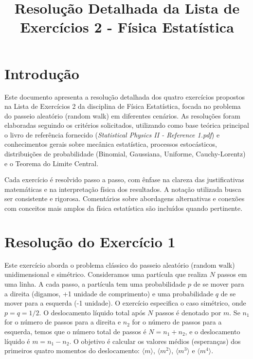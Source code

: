 \documentclass[12pt]{article}
\title{Resolução Detalhada da Lista de Exercícios 2 - Física Estatística}
\author{}
\date{}
\begin{document}
\maketitle

\section*{Introdução}

Este documento apresenta a resolução detalhada dos quatro exercícios propostos na Lista de Exercícios 2 da disciplina de Física Estatística, focada no problema do passeio aleatório (random walk) em diferentes cenários. As resoluções foram elaboradas seguindo os critérios solicitados, utilizando como base teórica principal o livro de referência fornecido (\textit{Statistical Physics II - Reference 1.pdf}) e conhecimentos gerais sobre mecânica estatística, processos estocásticos, distribuições de probabilidade (Binomial, Gaussiana, Uniforme, Cauchy-Lorentz) e o Teorema do Limite Central.

Cada exercício é resolvido passo a passo, com ênfase na clareza das justificativas matemáticas e na interpretação física dos resultados. A notação utilizada busca ser consistente e rigorosa. Comentários sobre abordagens alternativas e conexões com conceitos mais amplos da física estatística são incluídos quando pertinente.

\newpage

\section*{Resolução do Exercício 1}

Este exercício aborda o problema clássico do passeio aleatório (random walk) unidimensional e simétrico. Consideramos uma partícula que realiza $N$ passos em uma linha. A cada passo, a partícula tem uma probabilidade $p$ de se mover para a direita (digamos, +1 unidade de comprimento) e uma probabilidade $q$ de se mover para a esquerda (-1 unidade). O exercício especifica o caso simétrico, onde $p = q = 1/2$. O deslocamento líquido total após $N$ passos é denotado por $m$. Se $n_1$ for o número de passos para a direita e $n_2$ for o número de passos para a esquerda, temos que o número total de passos é $N = n_1 + n_2$, e o deslocamento líquido é $m = n_1 - n_2$. O objetivo é calcular os valores médios (esperanças) dos primeiros quatro momentos do deslocamento: $\langle m \rangle$, $\langle m^2 \rangle$, $\langle m^3 \rangle$ e $\langle m^4 \rangle$.
\end{document}
